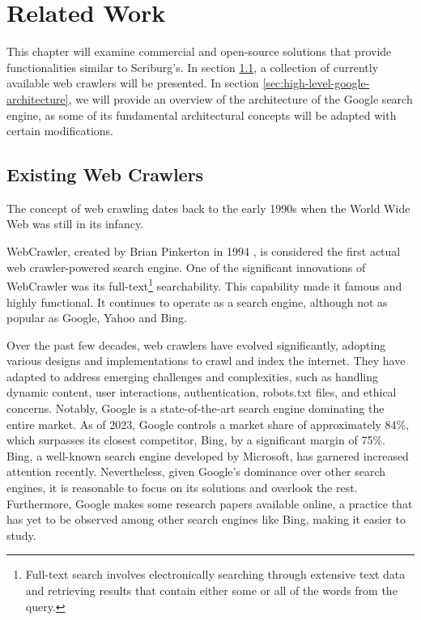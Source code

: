 \chapter{Related Work}
\label{chap:relatedwork}

This chapter will examine commercial and open-source solutions that provide functionalities similar to Scriburg's. In section \ref{sec:existing-web-crawlers}, a collection of currently available web crawlers will be presented. In section \ref{sec:high-level-google-architecture}, we will provide an overview of the architecture of the Google search engine, as some of its fundamental architectural concepts will be adapted with certain modifications.

\section{Existing Web Crawlers}\label{sec:existing-web-crawlers}
The concept of web crawling dates back to the early 1990s when the World Wide Web was still in its infancy.

WebCrawler, created by Brian Pinkerton in 1994 \cite{webcrawler}, is considered the first actual web crawler-powered search engine. One of the significant innovations of WebCrawler was its full-text\footnote{Full-text search involves electronically searching through extensive text data and retrieving results that contain either some or all of the words from the query.} searchability. This capability made it famous and highly functional. It continues to operate as a search engine, although not as popular as Google, Yahoo and Bing.

Over the past few decades, web crawlers have evolved significantly, adopting various designs and implementations to crawl and index the internet. They have adapted to address emerging challenges and complexities, such as handling dynamic content, user interactions, authentication, robots.txt files, and ethical concerns. Notably, Google is a state-of-the-art search engine dominating the entire market. As of 2023, Google controls a market share of approximately 84\%\cite{statista}, which surpasses its closest competitor, Bing, by a significant margin of 75\%. Bing, a well-known search engine developed by Microsoft, has garnered increased attention recently. Nevertheless, given Google's dominance over other search engines, it is reasonable to focus on its solutions and overlook the rest. Furthermore, Google makes some research papers available online, a practice that has yet to be observed among other search engines like Bing, making it easier to study.

